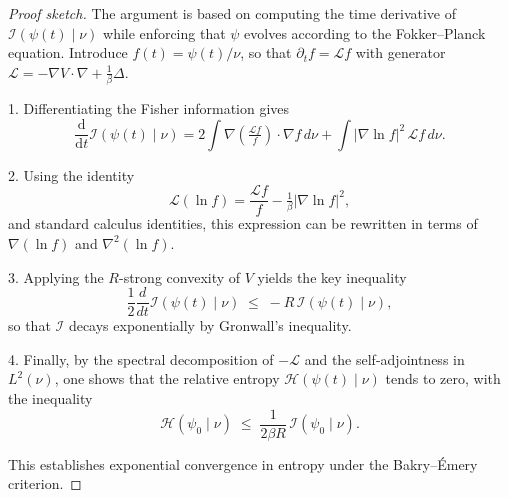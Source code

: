 \documentclass[11pt, twoside]{report}
\begin{document}
\begin{proof}[Proof sketch]
The argument is based on computing the time derivative of $\mathcal{I}(\psi(t)\mid\nu)$ while enforcing that $\psi$ evolves according to the Fokker–Planck equation.  
Introduce $f(t)=\psi(t)/\nu$, so that $\partial_t f = \mathcal{L}f$ with generator 
$\mathcal{L} = -\nabla V \cdot \nabla + \tfrac{1}{\beta}\Delta$.  

1. Differentiating the Fisher information gives
\[
\frac{\mathrm{d}}{\mathrm{d}t} \mathcal{I}(\psi(t)\mid\nu)
  = 2\int \nabla\!\left(\tfrac{\mathcal{L} f}{f}\right)\!\cdot\nabla f \, d\nu
    + \int |\nabla \ln f|^2 \, \mathcal{L}f \, d\nu.
\]

2. Using the identity
\[
\mathcal{L}(\ln f) = \frac{\mathcal{L} f}{f} - \tfrac{1}{\beta}|\nabla \ln f|^2,
\]
and standard calculus identities, this expression can be rewritten in terms of $\nabla(\ln f)$ and $\nabla^2(\ln f)$.  

3. Applying the $R$-strong convexity of $V$ yields the key inequality
\[
\frac{1}{2}\frac{d}{dt}\mathcal{I}(\psi(t)\mid\nu) \;\leq\; -R \,\mathcal{I}(\psi(t)\mid\nu),
\]
so that $\mathcal{I}$ decays exponentially by Gronwall’s inequality.  

4. Finally, by the spectral decomposition of $-\mathcal{L}$ and the self-adjointness in $L^2(\nu)$, one shows that the relative entropy $\mathcal{H}(\psi(t)\mid\nu)$ tends to zero, with the inequality
\[
\mathcal{H}(\psi_0 \mid \nu) \;\leq\; \frac{1}{2\beta R}\, \mathcal{I}(\psi_0 \mid \nu).
\]

This establishes exponential convergence in entropy under the Bakry–Émery criterion.
\end{proof}
\end{document}
